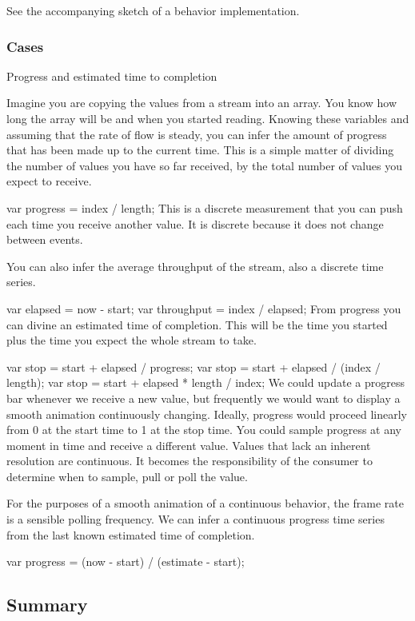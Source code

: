 See the accompanying sketch of a behavior implementation.

\subsubsection{Cases}

Progress and estimated time to completion

Imagine you are copying the values from a stream into an array. You know how long the array will be and when you started reading. Knowing these variables and assuming that the rate of flow is steady, you can infer the amount of progress that has been made up to the current time. This is a simple matter of dividing the number of values you have so far received, by the total number of values you expect to receive.

var progress = index / length;
This is a discrete measurement that you can push each time you receive another value. It is discrete because it does not change between events.

You can also infer the average throughput of the stream, also a discrete time series.

var elapsed = now - start;
var throughput = index / elapsed;
From progress you can divine an estimated time of completion. This will be the time you started plus the time you expect the whole stream to take.

var stop = start + elapsed / progress;
var stop = start + elapsed / (index / length);
var stop = start + elapsed * length / index;
We could update a progress bar whenever we receive a new value, but frequently we would want to display a smooth animation continuously changing. Ideally, progress would proceed linearly from 0 at the start time to 1 at the stop time. You could sample progress at any moment in time and receive a different value. Values that lack an inherent resolution are continuous. It becomes the responsibility of the consumer to determine when to sample, pull or poll the value.

For the purposes of a smooth animation of a continuous behavior, the frame rate is a sensible polling frequency. We can infer a continuous progress time series from the last known estimated time of completion.

var progress = (now - start) / (estimate - start);
\subsection{Summary}


